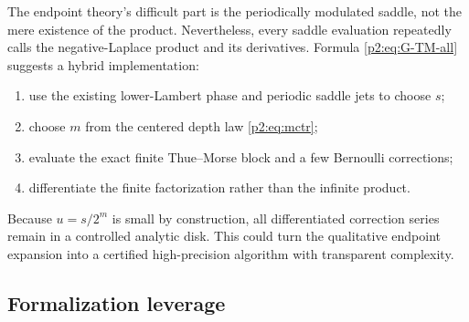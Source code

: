 \documentclass[11pt,oneside]{article}
\numberwithin{equation}{section}
\theoremstyle{definition}
\theoremstyle{remark}
\begin{document}
The endpoint theory's difficult part is the periodically modulated saddle, not the mere
existence of the product.  Nevertheless, every saddle evaluation repeatedly calls the
negative-Laplace product and its derivatives.  Formula \eqref{p2:eq:G-TM-all} suggests a hybrid
implementation:
\begin{enumerate}
\item use the existing lower-Lambert phase and periodic saddle jets to choose $s$;
\item choose $m$ from the centered depth law \eqref{p2:eq:mctr};
\item evaluate the exact finite Thue--Morse block and a few Bernoulli corrections;
\item differentiate the finite factorization rather than the infinite product.
\end{enumerate}
Because $u=s/2^m$ is small by construction, all differentiated correction series remain in a
controlled analytic disk.  This could turn the qualitative endpoint expansion into a
certified high-precision algorithm with transparent complexity.

\subsection{Formalization leverage}
\end{document}
